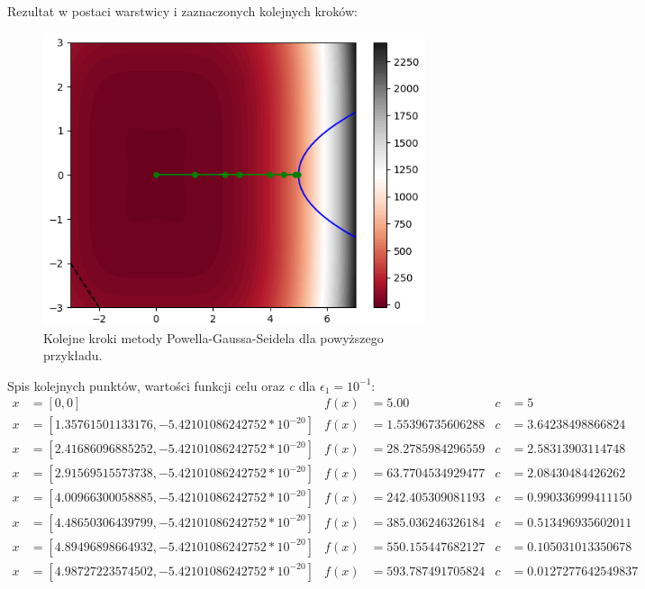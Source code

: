 \documentclass[a4paper,12pt]{article}
\begin{document}
\newpage
Rezultat w postaci warstwicy i zaznaczonych kolejnych kroków:
\begin{figure}[H]
    \centering
    \includegraphics[width=\textwidth]{images/p_plot2.png}
    \caption{Kolejne kroki metody Powella-Gaussa-Seidela dla powyższego przykładu.}
    \label{uml_gauss_seidel}
\end{figure}
Spis kolejnych punktów, wartości funkcji celu oraz \textit{c}  dla $\epsilon_{1} = 10^{-1}$:
\begin{align*}
x &= [0, 0] & 
f(x) &= 5.00 &
c &= 5 \\
x &= [1.35761501133176, -5.42101086242752 * 10^{-20}] & 
f(x) &= 1.55396735606288 &
c &= 3.64238498866824 \\
x &= [2.41686096885252, -5.42101086242752 * 10^{-20}] & 
f(x) &= 28.2785984296559 &
c &= 2.58313903114748 \\
x &= [2.91569515573738, -5.42101086242752 * 10^{-20}] & 
f(x) &= 63.7704534929477 &
c &= 2.08430484426262 \\
x &= [4.00966300058885, -5.42101086242752 * 10^{-20}] & 
f(x) &= 242.405309081193 &
c &= 0.990336999411150 \\
x &= [4.48650306439799, -5.42101086242752 * 10^{-20}] & 
f(x) &= 385.036246326184 &
c &= 0.513496935602011 \\
x &= [4.89496898664932, -5.42101086242752 * 10^{-20}] & 
f(x) &= 550.155447682127 &
c &= 0.105031013350678 \\
x &= [4.98727223574502, -5.42101086242752 * 10^{-20}] & 
f(x) &= 593.787491705824 &
c &= 0.0127277642549837 \\
\end{align*}
\end{document}
